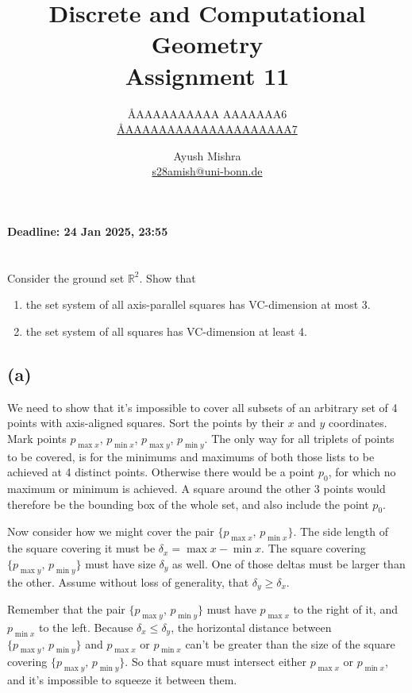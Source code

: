 \documentclass{article}
\title{Discrete and Computational Geometry \\ Assignment 11}
\author{
  \AA{AAAAAAAAAA AAAAAAA}{6} \\
  \href{mailto:\AA{AAAAAAAAAAAAAAAAAAAA}{7}}{\AA{AAAAAAAAAAAAAAAAAAAA}{7}}
  \and
  Ayush Mishra \\
  \href{mailto:s28amish@uni-bonn.de}{s28amish@uni-bonn.de}
}
\newcommand{\R}{\mathbb{R}}
\begin{document}
  \maketitle
  \begin{center}
    { \bfseries Deadline: 24 Jan 2025, 23:55 }
  \end{center}

  \section{}
  \begin{centerframebox}
    Consider the ground set $\R^2$. Show that
    \begin{enumerate}[label=(\alph*)]
      \item the set system of all axis-parallel squares has VC-dimension at most 3.
      \item the set system of all squares has VC-dimension at least 4.
    \end{enumerate}
  \end{centerframebox}

  \subsection{(a)}
  We need to show that it's impossible to cover all subsets of an arbitrary set of 4 points with axis-aligned squares.
  Sort the points by their $x$ and $y$ coordinates. Mark points $p_{\max x}$, $p_{\min x}$, $p_{\max y}$, $p_{\min y}$.
  The only way for all triplets of points to be covered,
  is for the minimums and maximums of both those lists to be achieved at 4 distinct points.
  Otherwise there would be a point $p_0$, for which no maximum or minimum is achieved.
  A square around the other 3 points would therefore be the bounding box of the whole set, and also include the point $p_0$.

  Now consider how we might cover the pair $\{p_{\max x},\, p_{\min x}\}$.
  The side length of the square covering it must be $\delta_x = \max x - \min x$.
  The square covering $\{p_{\max y},\, p_{\min y}\}$ must have size $\delta_y$ as well.
  One of those deltas must be larger than the other.
  Assume without loss of generality, that $\delta_y \geq \delta_x$.

  Remember that the pair $\{p_{\max y},\, p_{\min y}\}$ must have $p_{\max x}$ to the right of it, and $p_{\min x}$ to the left.
  Because $\delta_x \leq \delta_y$, the horizontal distance between $\{p_{\max y},\, p_{\min y}\}$ and $p_{\max x}$ or $p_{\min x}$ can't be greater than the size of the square covering $\{p_{\max y},\, p_{\min y}\}$.
  So that square must intersect either $p_{\max x}$ or $p_{\min x}$, and it's impossible to squeeze it between them.
\end{document}
